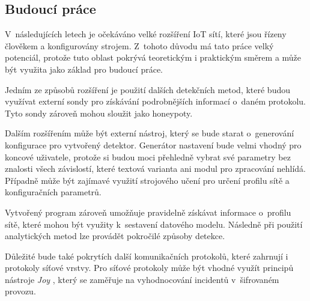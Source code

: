 \documentclass[thesis=M,czech]{FITthesis}[2012/06/26]
\begin{document}
\begin{conclusion}
\section{Budoucí práce}
V~následujících letech je očekáváno velké rozšíření IoT sítí, které jsou řízeny člověkem a 
konfigurovány strojem. Z~tohoto důvodu má tato práce velký potenciál, protože tuto oblast pokrývá
teoretickým i praktickým směrem a může být využita jako základ pro budoucí práce. 

Jedním ze způsobů
rozšíření je použití dalších detekčních metod, které budou využívat externí sondy pro získávání
podrobnějších informací o~daném protokolu. Tyto sondy zároveň mohou sloužit jako honeypoty.

Dalším rozšířením může být externí nástroj, který se bude starat o~generování konfigurace pro 
vytvořený detektor. Generátor nastavení bude velmi vhodný pro koncové uživatele, protože si budou
moci přehledně vybrat své parametry bez znalosti všech závislostí, které textová varianta ani 
modul pro zpracování nehlídá. Případně může být zajímavé využití strojového učení pro 
určení profilu sítě a konfiguračních parametrů.

Vytvořený program zároveň umožňuje pravidelně 
získávat informace o~profilu sítě, které mohou být využity k~sestavení datového modelu. 
Následně při použití
analytických metod lze provádět pokročilé způsoby detekce.

Důležité bude také pokrytích další komunikačních protokolů, které zahrnují i protokoly síťové 
vrstvy. Pro síťové protokoly může být vhodné využít principů nástroje \textit{Joy} \cite{joy}, 
který se zaměřuje 
na vyhodnocování incidentů v~šifrovaném provozu.
\end{conclusion}




\appendix
\end{document}
